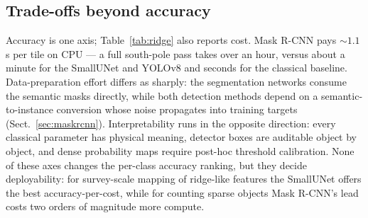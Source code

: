 \subsection{Trade-offs beyond accuracy}
\label{sec:tradeoffs}

Accuracy is one axis; Table~\ref{tab:ridge} also reports cost. Mask R-CNN pays ${\sim}1.1$\,s per tile on CPU --- a full south-pole pass takes over an hour, versus about a minute for the SmallUNet and YOLOv8 and seconds for the classical baseline. Data-preparation effort differs as sharply: the segmentation networks consume the semantic masks directly, while both detection methods depend on a semantic-to-instance conversion whose noise propagates into training targets (Sect.~\ref{sec:maskrcnn}). Interpretability runs in the opposite direction: every classical parameter has physical meaning, detector boxes are auditable object by object, and dense probability maps require post-hoc threshold calibration. None of these axes changes the per-class accuracy ranking, but they decide deployability: for survey-scale mapping of ridge-like features the SmallUNet offers the best accuracy-per-cost, while for counting sparse objects Mask R-CNN's lead costs two orders of magnitude more compute.

